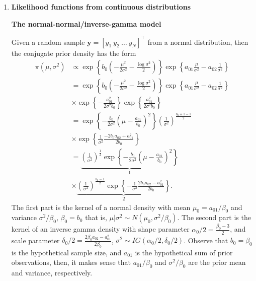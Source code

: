 \begin{enumerate}
\item \textbf{Likelihood functions from continuous distributions}

\textbf{The normal-normal/inverse-gamma model}

Given a random sample $\bm{y}=[y_1 \ y_2 \ \dots \ y_N]^{\top}$ from a normal distribution, then the conjugate prior density has the form 
\begin{align}
	\pi(\mu,\sigma^2)&\propto \exp\left\{b_0\left(-\frac{\mu^2}{2\sigma^2}-\frac{\log \sigma^2}{2}\right)\right\}\exp\left\{a_{01}\frac{\mu}{\sigma^2}-a_{02}\frac{1}{\sigma^2}\right\}\nonumber\\
	&=\exp\left\{b_0\left(-\frac{\mu^2}{2\sigma^2}-\frac{\log \sigma^2}{2}\right)\right\}\exp\left\{a_{01}\frac{\mu}{\sigma^2}-a_{02}\frac{1}{\sigma^2}\right\}\nonumber\\
	&\times \exp\left\{-\frac{a_{01}^2}{2\sigma^2b_0}\right\}\exp\left\{\frac{a_{01}^2}{2\sigma^2b_0}\right\}\nonumber\\
	&=\exp\left\{-\frac{b_0}{2\sigma^2}\left(\mu-\frac{a_{01}}{b_0}\right)^2\right\}\left(\frac{1}{\sigma^2}\right)^{\frac{b_0+1-1}{2}}\nonumber\\
	&\times \exp\left\{\frac{1}{\sigma^2}\frac{-2b_0a_{02}+a_{01}^2}{2b_0}\right\}\nonumber\\
	&=\underbrace{\left(\frac{1}{\sigma^2}\right)^{\frac{1}{2}}\exp\left\{-\frac{b_0}{2\sigma^2}\left(\mu-\frac{a_{01}}{b_0}\right)^2\right\}}_{1}\nonumber\\
	&\times\underbrace{\left(\frac{1}{\sigma^2}\right)^{\frac{b_0-1}{2}}\exp\left\{-\frac{1}{\sigma^2}\frac{2b_0a_{02}-a_{01}^2}{2b_0}\right\}}_{2}.\nonumber
\end{align}
The first part is the kernel of a normal density with mean $\mu_0=a_{01}/\beta_0$ and variance $\sigma^2/\beta_0$, $\beta_0=b_0$ that is, $\mu|\sigma^2\sim N(\mu_0,\sigma^2/\beta_0)$. The second part is the kernel of an inverse gamma density with shape parameter $\alpha_0/2=\frac{\beta_0-3}{2}$, and scale parameter $\delta_0/2=\frac{2\beta_0a_{02}-a_{01}^2}{2\beta_0}$, $\sigma^2\sim IG(\alpha_0/2,\delta_0/2)$. Observe that $b_0=\beta_0$ is the hypothetical sample size, and $a_{01}$ is the hypothetical sum of prior observations, then, it makes sense that $a_{01}/\beta_0$ and $\sigma^2/\beta_0$ are the prior mean and variance, respectively. 


\end{enumerate}
